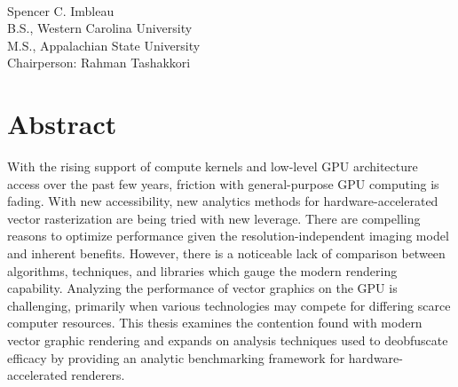 \begin{center}
    \thesistitle\\
    \bigskip
    Spencer C. Imbleau\\
    B.S., Western Carolina University\\
    M.S., Appalachian State University\\
    \bigskip
    Chairperson: Rahman Tashakkori
\end{center}

\section*{Abstract}

With the rising support of compute kernels and low-level GPU architecture access over the past few years, friction with general-purpose GPU computing is fading. With new accessibility, new analytics methods for hardware-accelerated vector rasterization are being tried with new leverage. There are compelling reasons to optimize performance given the resolution-independent imaging model and inherent benefits. However, there is a noticeable lack of comparison between algorithms, techniques, and libraries which gauge the modern rendering capability. Analyzing the performance of vector graphics on the GPU is challenging, primarily when various technologies may compete for differing scarce computer resources. This thesis examines the contention found with modern vector graphic rendering and expands on analysis techniques used to deobfuscate efficacy by providing an analytic benchmarking framework for hardware-accelerated renderers.